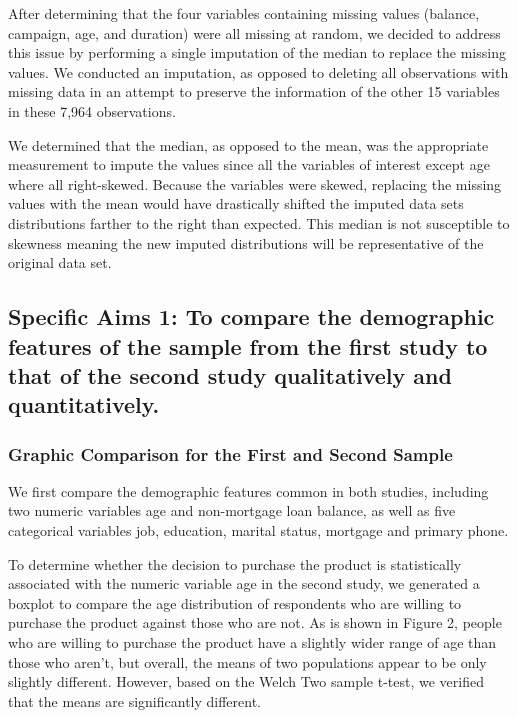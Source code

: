 \documentclass[]{article}
\begin{document}
After determining that the four variables containing missing values
(balance, campaign, age, and duration) were all missing at random, we
decided to address this issue by performing a single imputation of the
median to replace the missing values. We conducted an imputation, as
opposed to deleting all observations with missing data in an attempt to
preserve the information of the other 15 variables in these 7,964
observations.

We determined that the median, as opposed to the mean, was the
appropriate measurement to impute the values since all the variables of
interest except age where all right-skewed. Because the variables were
skewed, replacing the missing values with the mean would have
drastically shifted the imputed data sets distributions farther to the
right than expected. This median is not susceptible to skewness meaning
the new imputed distributions will be representative of the original
data set.

\hypertarget{specific-aims-1-to-compare-the-demographic-features-of-the-sample-from-the-first-study-to-that-of-the-second-study-qualitatively-and-quantitatively.}{%
\subsection{Specific Aims 1: To compare the demographic features of the
sample from the first study to that of the second study qualitatively
and
quantitatively.}\label{specific-aims-1-to-compare-the-demographic-features-of-the-sample-from-the-first-study-to-that-of-the-second-study-qualitatively-and-quantitatively.}}

\hypertarget{graphic-comparison-for-the-first-and-second-sample}{%
\subsubsection{Graphic Comparison for the First and Second
Sample}\label{graphic-comparison-for-the-first-and-second-sample}}

We first compare the demographic features common in both studies,
including two numeric variables age and non-mortgage loan balance, as
well as five categorical variables job, education, marital status,
mortgage and primary phone.

To determine whether the decision to purchase the product is
statistically associated with the numeric variable age in the second
study, we generated a boxplot to compare the age distribution of
respondents who are willing to purchase the product against those who
are not. As is shown in Figure 2, people who are willing to purchase the
product have a slightly wider range of age than those who aren't, but
overall, the means of two populations appear to be only slightly
different. However, based on the Welch Two sample t-test, we verified
that the means are significantly different.
\end{document}

